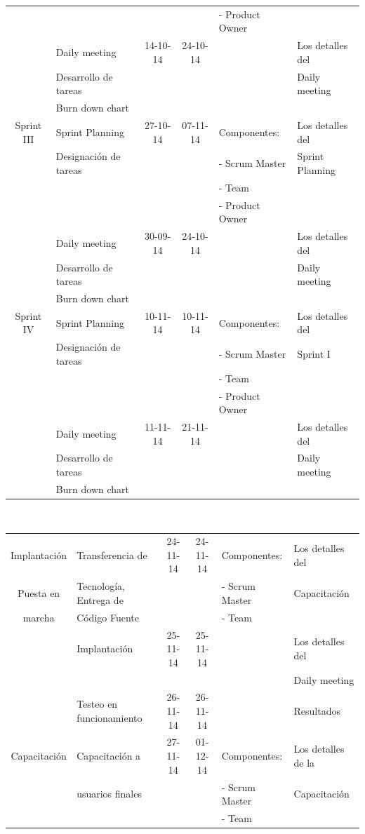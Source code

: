 \documentclass[11pt,letterpaper]{report}
\begin{document}
\begin{tabular}{|c|p{4cm}|c|c|l|p{3cm}|}
	& & & & - Product Owner & \\
	\cline{2-4} \cline{6-6}
	& Daily meeting & 14-10-14 & 24-10-14 & & Los detalles del  \\ 
	& Desarrollo de tareas &&&& Daily meeting\\
	& Burn down chart &&&& \\
	\hline %
	Sprint III& Sprint Planning & 27-10-14 & 07-11-14 &  Componentes: & Los detalles del \\
	& Designación de tareas &  &  & - Scrum Master & Sprint Planning \\
	& & & & - Team & \\
	& & & & - Product Owner & \\
	\cline{2-4} \cline{6-6}
	& Daily meeting & 30-09-14 & 24-10-14 & & Los detalles del  \\ 
	& Desarrollo de tareas &&&& Daily meeting\\
	& Burn down chart &&&& \\
	\hline %
	Sprint IV& Sprint Planning & 10-11-14 & 10-11-14 &  Componentes: & Los detalles del \\
	& Designación de tareas &  &  & - Scrum Master & Sprint I \\
	& & & & - Team & \\
	& & & & - Product Owner & \\
	\cline{2-4} \cline{6-6}
	& Daily meeting & 11-11-14 & 21-11-14 & & Los detalles del  \\ 
	& Desarrollo de tareas &&&& Daily meeting\\
	& Burn down chart &&&& \\
	\hline %
	
\end{tabular}\\
\newpage
\begin{tabular}{|c|p{4cm}|c|c|l|p{3cm}|}
	\hline
	Implantación & Transferencia de & 24-11-14 & 24-11-14 &  Componentes: & Los detalles del \\
	Puesta en & Tecnología, Entrega de &  &  & - Scrum Master & Capacitación \\
	marcha& Código Fuente & & & - Team & \\
	\cline{2-4} \cline{6-6}
	& Implantación & 25-11-14 & 25-11-14 & & Los detalles del  \\ 
	& &&&& Daily meeting\\
	\cline{2-4} \cline{6-6}
	& Testeo en funcionamiento  & 26-11-14 & 26-11-14 && Resultados \\
	\hline %
	Capacitación & Capacitación a  & 27-11-14 & 01-12-14 &  Componentes: & Los detalles de la \\
	& usuarios finales &  &  & - Scrum Master & Capacitación \\
	& & & & - Team & \\
	\hline %
\end{tabular}
\end{document}
